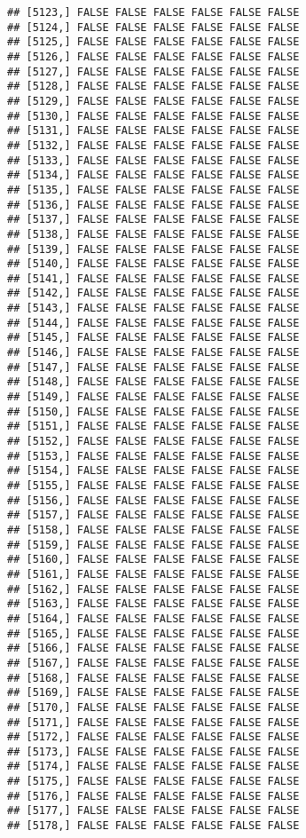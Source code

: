 \documentclass[
]{article}
\begin{document}
\begin{verbatim}
## [5123,] FALSE FALSE FALSE FALSE FALSE FALSE
## [5124,] FALSE FALSE FALSE FALSE FALSE FALSE
## [5125,] FALSE FALSE FALSE FALSE FALSE FALSE
## [5126,] FALSE FALSE FALSE FALSE FALSE FALSE
## [5127,] FALSE FALSE FALSE FALSE FALSE FALSE
## [5128,] FALSE FALSE FALSE FALSE FALSE FALSE
## [5129,] FALSE FALSE FALSE FALSE FALSE FALSE
## [5130,] FALSE FALSE FALSE FALSE FALSE FALSE
## [5131,] FALSE FALSE FALSE FALSE FALSE FALSE
## [5132,] FALSE FALSE FALSE FALSE FALSE FALSE
## [5133,] FALSE FALSE FALSE FALSE FALSE FALSE
## [5134,] FALSE FALSE FALSE FALSE FALSE FALSE
## [5135,] FALSE FALSE FALSE FALSE FALSE FALSE
## [5136,] FALSE FALSE FALSE FALSE FALSE FALSE
## [5137,] FALSE FALSE FALSE FALSE FALSE FALSE
## [5138,] FALSE FALSE FALSE FALSE FALSE FALSE
## [5139,] FALSE FALSE FALSE FALSE FALSE FALSE
## [5140,] FALSE FALSE FALSE FALSE FALSE FALSE
## [5141,] FALSE FALSE FALSE FALSE FALSE FALSE
## [5142,] FALSE FALSE FALSE FALSE FALSE FALSE
## [5143,] FALSE FALSE FALSE FALSE FALSE FALSE
## [5144,] FALSE FALSE FALSE FALSE FALSE FALSE
## [5145,] FALSE FALSE FALSE FALSE FALSE FALSE
## [5146,] FALSE FALSE FALSE FALSE FALSE FALSE
## [5147,] FALSE FALSE FALSE FALSE FALSE FALSE
## [5148,] FALSE FALSE FALSE FALSE FALSE FALSE
## [5149,] FALSE FALSE FALSE FALSE FALSE FALSE
## [5150,] FALSE FALSE FALSE FALSE FALSE FALSE
## [5151,] FALSE FALSE FALSE FALSE FALSE FALSE
## [5152,] FALSE FALSE FALSE FALSE FALSE FALSE
## [5153,] FALSE FALSE FALSE FALSE FALSE FALSE
## [5154,] FALSE FALSE FALSE FALSE FALSE FALSE
## [5155,] FALSE FALSE FALSE FALSE FALSE FALSE
## [5156,] FALSE FALSE FALSE FALSE FALSE FALSE
## [5157,] FALSE FALSE FALSE FALSE FALSE FALSE
## [5158,] FALSE FALSE FALSE FALSE FALSE FALSE
## [5159,] FALSE FALSE FALSE FALSE FALSE FALSE
## [5160,] FALSE FALSE FALSE FALSE FALSE FALSE
## [5161,] FALSE FALSE FALSE FALSE FALSE FALSE
## [5162,] FALSE FALSE FALSE FALSE FALSE FALSE
## [5163,] FALSE FALSE FALSE FALSE FALSE FALSE
## [5164,] FALSE FALSE FALSE FALSE FALSE FALSE
## [5165,] FALSE FALSE FALSE FALSE FALSE FALSE
## [5166,] FALSE FALSE FALSE FALSE FALSE FALSE
## [5167,] FALSE FALSE FALSE FALSE FALSE FALSE
## [5168,] FALSE FALSE FALSE FALSE FALSE FALSE
## [5169,] FALSE FALSE FALSE FALSE FALSE FALSE
## [5170,] FALSE FALSE FALSE FALSE FALSE FALSE
## [5171,] FALSE FALSE FALSE FALSE FALSE FALSE
## [5172,] FALSE FALSE FALSE FALSE FALSE FALSE
## [5173,] FALSE FALSE FALSE FALSE FALSE FALSE
## [5174,] FALSE FALSE FALSE FALSE FALSE FALSE
## [5175,] FALSE FALSE FALSE FALSE FALSE FALSE
## [5176,] FALSE FALSE FALSE FALSE FALSE FALSE
## [5177,] FALSE FALSE FALSE FALSE FALSE FALSE
## [5178,] FALSE FALSE FALSE FALSE FALSE FALSE

\end{verbatim}
\end{document}
